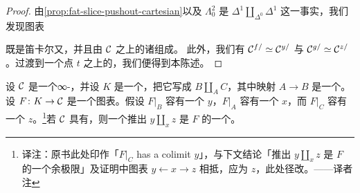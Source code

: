 \begin{proof}
由\cref{prop:fat-slice-pushout-cartesian}以及 $\Lambda^2_0$ 是\trPushout{}%
$\Delta^1 \amalg_{\Delta^0} \Delta^1$ 这一事实，我们发现图表
\begin{center}
\end{center}
既是笛卡尔又\trHomotopyCartesian{}，并且由 $\mathcal{C}$ 之上的诸\trLeftFibration{}组成。
此外，我们有 $\mathcal{C}^{f/} \simeq \mathcal{C}^{y/}$ 与 $\mathcal{C}^{g/} \simeq \mathcal{C}^{z/}$。过渡到一个点
$t$ 之上的\trFibre{}，我们便得到本陈述。
\end{proof}

\begin{proposition}\label{prop:pushout-colimit-existence}
设 $\mathcal{C}$ 是一个∞-\trCategory{}，并设 $K$ 是一个\trSimplicialSet{}，把它写成%
\trPushout{} $B \amalg_A C$，其中映射 $A \to B$ 是一个\trMonomorphism{}。设
$F\colon K \to \mathcal{C}$ 是一个图表。假设 $F|_B$ 容有一个\trColimit{} $y$，$F|_A$ 容有一个%
\trColimit{} $x$，而 $F|_C$ 容有一个\trColimit{}%
$z$。\footnote{译注：原书此处印作「$F|_C$ has a colimit $y$」，与下文结论「推出
$y \amalg_x z$ 是 $F$ 的一个余极限」及证明中图表 $y \leftarrow x \to z$ 相抵，应为
$z$，此处径改。——译者注}若 $\mathcal{C}$ 具有\trPushout{}，则一个推出 $y \amalg_x z$ 是
$F$ 的一个\trColimit{}。
\end{proposition}

